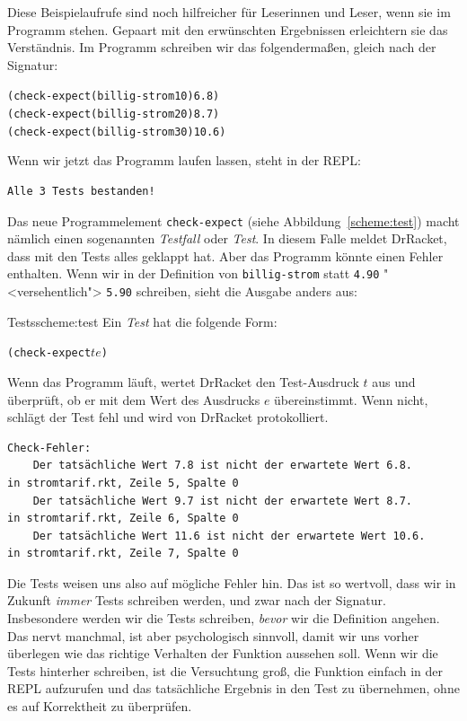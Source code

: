 Diese Beispielaufrufe sind noch hilfreicher für Leserinnen und Leser,
wenn sie im Programm stehen.  Gepaart mit den erwünschten Ergebnissen
erleichtern sie das Verständnis.  Im Programm schreiben wir
das folgendermaßen, gleich nach der Signatur:
%
\begin{alltt}
(check-expect (billig-strom 10) 6.8)
(check-expect (billig-strom 20) 8.7)
(check-expect (billig-strom 30) 10.6)
\end{alltt}
%
Wenn wir jetzt das Programm laufen lassen, steht in der REPL:
%
\begin{verbatim}
Alle 3 Tests bestanden!
\end{verbatim}
%
Das neue Programmelement
\texttt{check-expect} (siehe
Abbildung~\ref{scheme:test}) macht
nämlich einen sogenannten \textit{Testfall} oder \textit{Test}.  In diesem Falle
meldet DrRacket, dass mit den Tests alles geklappt hat.  Aber das
Programm könnte einen Fehler enthalten.  Wenn wir in der Definition
von \texttt{billig-strom} statt \texttt{4.90} "<versehentlich">
\texttt{5.90} schreiben, sieht die Ausgabe anders aus:
%
\begin{feature}{Tests}{scheme:test}
  Ein \textit{Test} hat die folgende Form:
\begin{alltt}
(check-expect \(t\) \(e\))
\end{alltt}
%
Wenn das Programm läuft, wertet DrRacket den Test-Ausdruck $t$ aus und
überprüft, ob er mit dem Wert des Ausdrucks $e$ übereinstimmt.  Wenn
nicht, schlägt der Test fehl und wird von DrRacket protokolliert.
\end{feature}
%
\begin{verbatim}
Check-Fehler:
	Der tatsächliche Wert 7.8 ist nicht der erwartete Wert 6.8.
in stromtarif.rkt, Zeile 5, Spalte 0 
	Der tatsächliche Wert 9.7 ist nicht der erwartete Wert 8.7.
in stromtarif.rkt, Zeile 6, Spalte 0 
	Der tatsächliche Wert 11.6 ist nicht der erwartete Wert 10.6.
in stromtarif.rkt, Zeile 7, Spalte 0 
\end{verbatim}
%
Die Tests weisen uns also auf mögliche Fehler hin.  Das ist so
wertvoll, dass wir in Zukunft \emph{immer} Tests schreiben werden, und
zwar nach der Signatur.  Insbesondere werden wir die Tests schreiben,
\emph{bevor} wir die Definition angehen.  Das nervt manchmal, ist aber
psychologisch sinnvoll, damit wir uns vorher überlegen wie das
richtige Verhalten der Funktion aussehen soll.  Wenn wir die Tests
hinterher schreiben, ist die Versuchtung groß, die Funktion einfach in
der REPL aufzurufen und das tatsächliche Ergebnis in den Test zu
übernehmen, ohne es auf Korrektheit zu überprüfen.

